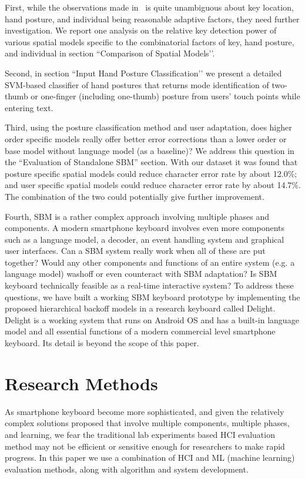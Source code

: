 \documentclass{sigchi}
\begin{document}
First, while the observations made in~\cite{Azenkot:2012} is quite unambiguous about key location, hand posture, and individual being reasonable adaptive factors, they need further investigation.  We report one analysis on the relative key detection power of various spatial models specific to the combinatorial factors of key, hand posture,  and individual in section ``Comparison of Spatial Models’’.

Second, in section ``Input Hand Posture Classification’’ we present a detailed SVM-based classifier of hand postures that returns mode identification of two-thumb or one-finger (including one-thumb) posture from users’ touch points while entering text.

Third, using the posture classification method and user adaptation, does higher order specific models really offer better error corrections than a lower order or base model without language model (as a baseline)? We address this question in the ``Evaluation of Standalone SBM” section. With our dataset it was found that posture specific spatial models could reduce character error rate by about 12.0\%; and user specific spatial models could reduce character error rate by about 14.7\%. The combination of the two could potentially give further improvement. 

Fourth, SBM is a rather complex approach involving multiple phases and components. A modern smartphone keyboard involves even more components such as a language model, a decoder, an event handling system and graphical user interfaces.  Can a SBM system really work when all of these are put together? Would any other components and functions of an entire system (e.g. a language model) washoff or even counteract with SBM adaptation? Is SBM keyboard technically feasible as a real-time interactive system? To address these questions, we have built a working SBM keyboard prototype by implementing the proposed hierarchical backoff models in a research keyboard called Delight. Delight is a working system that runs on Android OS and has a built-in language model and all essential functions of a modern commercial level smartphone keyboard. Its detail is beyond the scope of this paper.

\section{Research Methods}
As smartphone keyboard become more sophisticated, and given the relatively complex solutions proposed that involve multiple components, multiple phases, and learning,  we fear the traditional lab experiments based HCI evaluation method may not be efficient or sensitive enough for researchers to make rapid progress. In this paper we use a combination of HCI and ML (machine learning) evaluation methods, along with algorithm and system development. 
\end{document}
